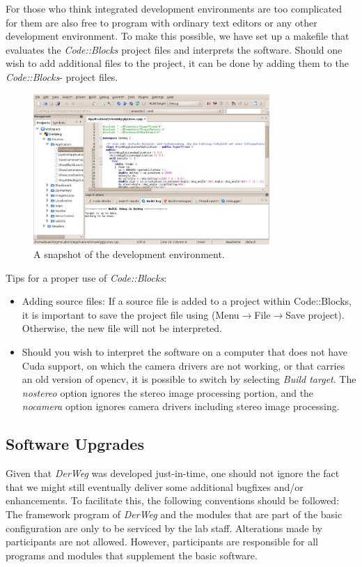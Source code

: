 \documentclass[a4paper, 11pt]{article}
\newcommand{\DerWeg}{\textit{DerWeg }} %
\begin{document}
For those who think integrated development environments are too complicated for them are also free to program with ordinary text editors or any other development environment. To make this possible, we have set up a makefile that evaluates the \textit{Code::Blocks} project files and interprets the software. Should one wish to add additional files to the project, it can be done by adding them to the \textit{Code::Blocks}- project files.

\begin{figure}
\centering
\includegraphics[width=0.8\textwidth]{codeblockssnapshot}
\caption{A snapshot of the development environment.}
\label{fig:codeblockssnapshot}
\end{figure}

Tips for a proper use of \textit{Code::Blocks}: 
\begin{itemize}
\item Adding source files: If a source file is added to a project within Code::Blocks, it is important to save the project file using (Menu$\rightarrow$File$\rightarrow$Save project). Otherwise, the new file will not be interpreted.
\item Should you wish to interpret the software on a computer that does not have Cuda support, on which the camera drivers are not working, or that carries an old version of opencv, it is possible to switch by selecting \textit{Build target}. The \textit{nostereo} option ignores the stereo image processing portion, and the \textit{nocamera} option ignores camera drivers including stereo image processing.
\end{itemize}

\subsection{Software Upgrades}

Given that \DerWeg was developed just-in-time, one should not ignore the fact that we might still eventually deliver some additional bugfixes and/or enhancements. To facilitate this, the following conventions should be followed: The framework program of \DerWeg and the modules that are part of the basic configuration are only to be serviced by the lab staff. Alterations made by participants are not allowed. However, participants are responsible for all programs and modules that supplement the basic software.
\end{document}
